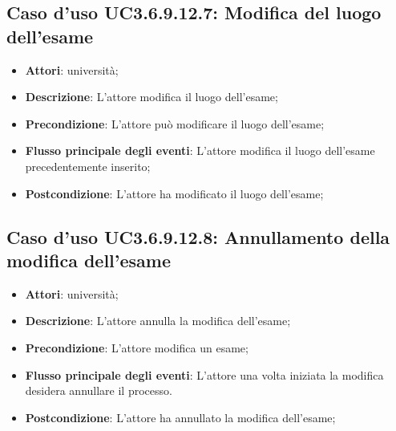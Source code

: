 \subsection{Caso d'uso \texorpdfstring{UC3.6.9.12.7}{UC3.6.9.12.7}: Modifica del luogo dell’esame}
\begin{itemize}
\item \textbf{Attori}: università;
\item \textbf{Descrizione}: L'attore modifica il luogo dell’esame;

\item \textbf{Precondizione}: L'attore può modificare il luogo dell’esame;

\item \textbf{Flusso principale degli eventi}: L'attore modifica il luogo dell’esame precedentemente inserito;

\item \textbf{Postcondizione}: L'attore ha modificato il luogo dell’esame;

\end{itemize}
\subsection{Caso d'uso \texorpdfstring{UC3.6.9.12.8}{UC3.6.9.12.8}: Annullamento della modifica dell’esame}
\begin{itemize}
\item \textbf{Attori}: università;
\item \textbf{Descrizione}: L'attore annulla la modifica dell'esame;

\item \textbf{Precondizione}: L'attore modifica un esame;

\item \textbf{Flusso principale degli eventi}: L'attore una volta iniziata la modifica desidera annullare il processo.

\item \textbf{Postcondizione}: L'attore ha annullato la modifica dell'esame;

\end{itemize}
